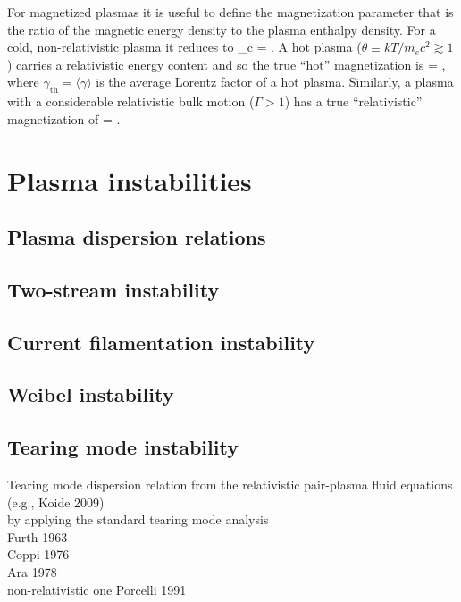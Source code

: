 \documentclass{aa}
\begin{document}
For magnetized plasmas it is useful to define the magnetization parameter that is the ratio of the magnetic energy density to the plasma enthalpy density.
For a cold, non-relativistic plasma it reduces to 
\be
\sigma_c = .
\ee
A hot plasma ($\theta \equiv kT/m_e c^2 \gtrsim 1$) carries a relativistic energy content and so the true ``hot'' magnetization is
\be
\sigma =  
        \approx {},
\ee
where $\gamma_{\mathrm{th}} = \langle \gamma \rangle$ is the average Lorentz factor of a hot plasma.
Similarly, a plasma with a considerable relativistic bulk motion ($\Gamma > 1$) has a true ``relativistic'' magnetization of
\be
\sigma = .
\ee


\section{Plasma instabilities}


\subsection{Plasma dispersion relations}

\subsection{Two-stream instability}

\subsection{Current filamentation instability}

\subsection{Weibel instability}

\subsection{Tearing mode instability}

Tearing mode dispersion relation from the relativistic pair-plasma fluid equations (e.g., Koide 2009)\\
by applying the standard tearing mode analysis\\
Furth 1963\\
Coppi 1976\\
Ara 1978\\
non-relativistic one Porcelli 1991\\
\end{document}
